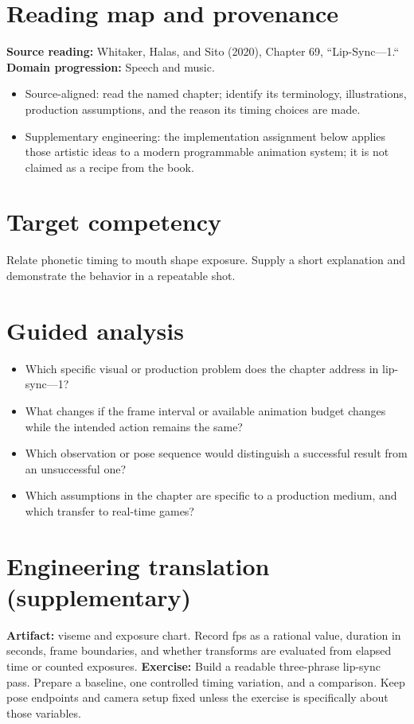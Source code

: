 \documentclass[10pt,letterpaper]{article}
\begin{document}
\makedoctitle
\makedocsummary

\section{Reading map and provenance}
\textbf{Source reading:} Whitaker, Halas, and Sito (2020), Chapter 69, ``Lip-Sync—1.``\\
\textbf{Domain progression:} Speech and music.
\begin{itemize}
\item Source-aligned: read the named chapter; identify its terminology, illustrations, production assumptions, and the reason its timing choices are made.
\item Supplementary engineering: the implementation assignment below applies those artistic ideas to a modern programmable animation system; it is not claimed as a recipe from the book.
\end{itemize}
\section{Target competency}
Relate phonetic timing to mouth shape exposure. Supply a short explanation and demonstrate the behavior in a repeatable shot.
\section{Guided analysis}
\begin{itemize}
\item Which specific visual or production problem does the chapter address in lip-sync—1?
\item What changes if the frame interval or available animation budget changes while the intended action remains the same?
\item Which observation or pose sequence would distinguish a successful result from an unsuccessful one?
\item Which assumptions in the chapter are specific to a production medium, and which transfer to real-time games?
\end{itemize}
\section{Engineering translation (supplementary)}
\textbf{Artifact:} viseme and exposure chart. Record fps as a rational value, duration in seconds, frame boundaries, and whether transforms are evaluated from elapsed time or counted exposures.
\textbf{Exercise:} Build a readable three-phrase lip-sync pass. Prepare a baseline, one controlled timing variation, and a comparison. Keep pose endpoints and camera setup fixed unless the exercise is specifically about those variables.
\end{document}
